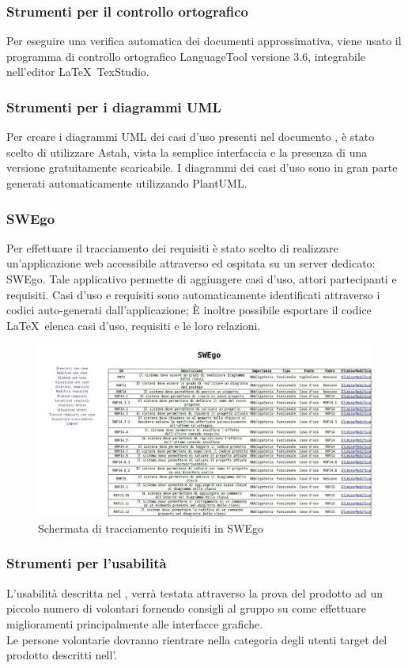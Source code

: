 \documentclass[../NormeDiProgetto.tex]{subfiles}
\begin{document}
			\subsubsection{Strumenti per il controllo ortografico}
				Per eseguire una verifica automatica dei documenti approssimativa,
				viene usato il programma di controllo ortografico LanguageTool versione 3.6, integrabile
				nell'editor \LaTeX\ TexStudio.
			\subsubsection{Strumenti per i diagrammi UML}	
				Per creare i diagrammi UML dei casi d'uso presenti nel documento \analisideirequisitiv,
				è stato scelto di utilizzare Astah, vista la semplice interfaccia e la presenza di una
				versione gratuitamente scaricabile.
				I diagrammi dei casi d'uso sono in gran parte generati automaticamente utilizzando PlantUML.
			\subsubsection{SWEgo}
				Per effettuare il tracciamento dei requisiti è stato scelto di realizzare un'applicazione
				web accessibile attraverso  ed ospitata su un server dedicato: SWEgo.
				Tale applicativo permette di aggiungere casi d'uso, attori partecipanti e requisiti.
				Casi d'uso e requisiti sono automaticamente identificati attraverso i codici auto-generati
				dall'applicazione; È inoltre possibile esportare il codice \LaTeX\ elenca casi d'uso,
				requisiti e le loro relazioni.
				\begin{figure} [h!]
					\centering
					\includegraphics[scale=0.42]{./Immagini/SWEgo.jpg}
					\caption{Schermata di tracciamento requisiti in SWEgo}\label{}
				\end{figure}
			\subsubsection{Strumenti per l'usabilità}
				L'usabilità descritta nel \pianodiqualificav, verrà testata attraverso la prova del prodotto
				ad un piccolo numero di volontari fornendo consigli al gruppo su come effettuare
				miglioramenti principalmente alle interfacce grafiche.\\
				Le persone volontarie dovranno rientrare nella categoria degli utenti target del prodotto
				descritti nell'\analisideirequisitiv.
\end{document}
